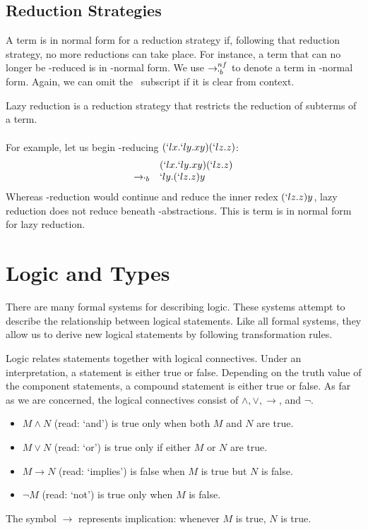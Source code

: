   \subsection{Reduction Strategies}
 
  A term is in normal form for a reduction strategy if, 
    following that reduction strategy,
  no more reductions can take place.
  For instance, a term that can no longer be \bta-reduced is in \bta-normal form.
  We use $\to_{`b}^{nf}$ to denote a term in \bta-normal form.
  Again, we can omit the \bta\ subscript if it is clear from context.
  
  Lazy reduction is a reduction strategy that restricts the reduction of subterms of a term.
  \\  
  \\
  For example, let us begin \bta-reducing $(`lx.`ly.xy)(`lz.z)$: 
  \[
  \begin{array}{rll}
            & (`lx.`ly.xy)(`lz.z) \\
    \to_{`b}& `ly.(`lz.z)y
  \end{array}
  \]
  Whereas \bta-reduction would continue and reduce the inner redex $(`lz.z)y$,
  lazy reduction does not reduce beneath \lam-abstractions.
  This is term is in normal form for lazy reduction.

\section{Logic and Types}

  There are many formal systems for describing logic.
  These systems attempt to describe the relationship between logical statements.
  Like all formal systems, 
  they allow us to derive new logical statements by following transformation rules.

  Logic relates statements together with logical connectives.
  Under an interpretation, a statement is either true or false.
  Depending on the truth value of the component statements, a compound statement is either true or false.
  As far as we are concerned, the logical connectives consist of $\land, \lor, \to$, and $\neg$.
  \begin{itemize}
    \item $M \land N$ (read: `and') is true only when both $M$ and $N$ are true.
    \item $M \lor N$ (read: `or') is true only if either $M$ or $N$ are true. 
    \item $M \to N$ (read: `implies') is false when $M$ is true but $N$ is false.
    \item $\neg M$ (read: `not') is true only when $M$ is false.
  \end{itemize}
  The symbol $\to$ represents implication: whenever $M$ is true, $N$ is true.
  
